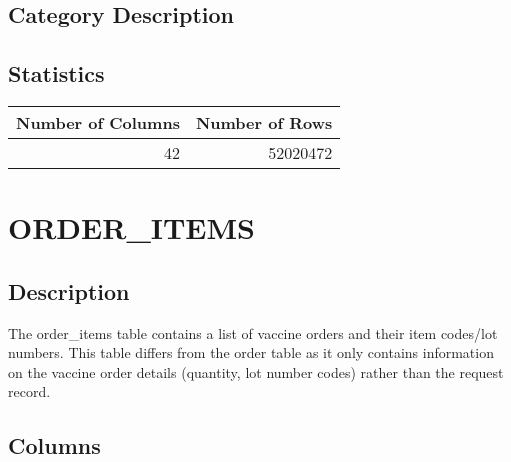 \documentclass[
  letterpaper,
  DIV=11,
  numbers=noendperiod]{scrreprt}
\begin{document}
\hypertarget{category-description-20}{%
\section*{Category Description}\label{category-description-20}}

\hypertarget{statistics-20}{%
\section*{Statistics}\label{statistics-20}}

\begin{longtable}{rr}
\toprule
Number of Columns & Number of Rows \\ 
\midrule
42 & 52020472 \\ 
\bottomrule
\end{longtable}

\hypertarget{order_items}{%
\chapter*{ORDER\_ITEMS}\label{order_items}}

\hypertarget{description-21}{%
\section*{Description}\label{description-21}}

The order\_items table contains a list of vaccine orders and their item
codes/lot numbers. This table differs from the order table as it only
contains information on the vaccine order details (quantity, lot number
codes) rather than the request record.

\hypertarget{columns-21}{%
\section*{Columns}\label{columns-21}}
\end{document}
